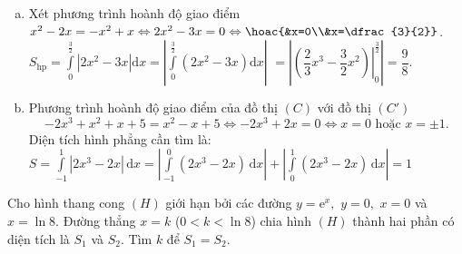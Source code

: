 \begin{vd}
{\begin{enumerate}[a)]
			\item Xét phương trình hoành độ giao điểm $x^2-2x=-x^2+x \Leftrightarrow 2x^2-3x=0 \Leftrightarrow \hoac{&x=0\\&x=\dfrac{3}{2}}$.\\
			$S_\text{hp}=\displaystyle\int \limits_0^{\tfrac{3}{2}}{\left|2x^2-3x \right|}\mathrm{d}x =\left|\displaystyle\int \limits_0^{\tfrac{3}{2}}{(2x^2-3x)}\mathrm{d}x\right|$ $=\left|\left.\left(\dfrac{2}{3}x^3-\dfrac{3}{2}x^2\right)\right|_0^{\tfrac{3}{2}}\right|=\dfrac{9}{8}$.
			\item Phương trình hoành độ giao điểm của đồ thị $(C)$ với đồ thị $\left(C'\right)$
			$$-2x^3+x^2+x+5=x^2-x+5\Leftrightarrow -2x^3+2x=0\Leftrightarrow x=0 \text{ hoặc } x=\pm 1.$$
			Diện tích hình phẳng cần tìm là:\\
			$S=\displaystyle\int\limits_{-1}^1 \left|2x^3-2x\right|\mathrm{\,d}x=\left|\displaystyle\int\limits_{-1}^0 (2x^3-2x) \mathrm{\,d}x\right|+\left|\displaystyle\int\limits_0^1 (2x^3-2x) \mathrm{\,d}x\right|=1$
	\end{enumerate}}
\end{vd}

\begin{vd}%
	Cho hình thang cong $(H)$ giới hạn bởi các đường $y=\mathrm{e}^x,$ $y=0,$ $x=0$ và $x=\ln 8.$ Đường thẳng $x=k$ ($0<k<\ln8$) chia hình $(H)$ thành hai phần có diện tích là $S_1$ và $S_2$. Tìm $k$ để $S_1=S_2$.
\end{vd}

